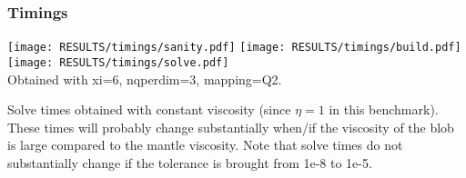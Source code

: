 


\subsubsection{Timings}


\begin{center}
\texttt{[image: RESULTS/timings/sanity.pdf]}
\texttt{[image: RESULTS/timings/build.pdf]}
\texttt{[image: RESULTS/timings/solve.pdf]}\\
Obtained with xi=6, nqperdim=3, mapping=Q2.
\end{center}

Solve times obtained with constant viscosity (since $\eta=1$ in this benchmark).
These times will probably change substantially when/if the viscosity of the 
blob is large compared to the mantle viscosity.
Note that solve times do not substantially change if the tolerance is brought from 1e-8 to 1e-5.
